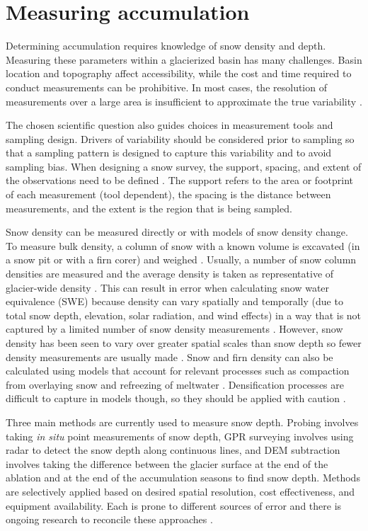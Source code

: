 \documentclass[12pt]{article}
\begin{document}
\section{Measuring accumulation}
Determining accumulation requires knowledge of snow density and depth. Measuring these parameters within a glacierized basin has many challenges. Basin location and topography affect accessibility, while the cost and time required to conduct measurements can be prohibitive. In most cases, the resolution of measurements over a large area is insufficient to approximate the true variability \citep{Bloeschl1999, Deems2006a}.

The chosen scientific question also guides choices in measurement tools and sampling design. Drivers of variability should be considered prior to sampling so that a sampling pattern is designed to capture this variability and to avoid sampling bias. When designing a snow survey, the support, spacing, and extent of the observations need to be defined \citep{Bloschl1995}. The support refers to the area or footprint of each measurement (tool dependent), the spacing is the distance between measurements, and the extent is the region that is being sampled. 

Snow density can be measured directly or with models of snow density change. To measure bulk density, a column of snow with a known volume is excavated (in a snow pit or with a firn corer) and weighed \citep{Sold2013, Sold2014}. Usually, a number of snow column densities are measured and the average density is taken as representative of glacier-wide density \citep[e.g.][]{Machguth2006, Grunewald2010, McGrath2015}. This can result in error when calculating snow water equivalence (SWE) because density can vary spatially and temporally (due to total snow depth, elevation, solar radiation, and wind effects) in a way that is not captured by a limited number of snow density measurements \citep{Grunewald2010, Wetlaufer2016}. However, snow density has been seen to vary over greater spatial scales than snow depth so fewer density measurements are usually made \citep{Elder1998, Clark2011}. Snow and firn density can also be calculated using models that account for relevant processes such as compaction from overlaying snow and refreezing of meltwater \citep{Herron1980, Sold2014}. Densification processes are difficult to capture in models though, so they should be applied with caution \citep{Mellor1974}.

Three main methods are currently used to measure snow depth. Probing involves taking \textit{in situ} point measurements of snow depth, GPR surveying involves using radar to detect the snow depth along continuous lines, and DEM subtraction involves taking the difference between the glacier surface at the end of the ablation and at the end of the accumulation seasons to find snow depth. Methods are selectively applied based on desired spatial resolution, cost effectiveness, and equipment availability. Each is prone to different sources of error and there is ongoing research to reconcile these approaches \citep{Sold2014}.  
\end{document}
